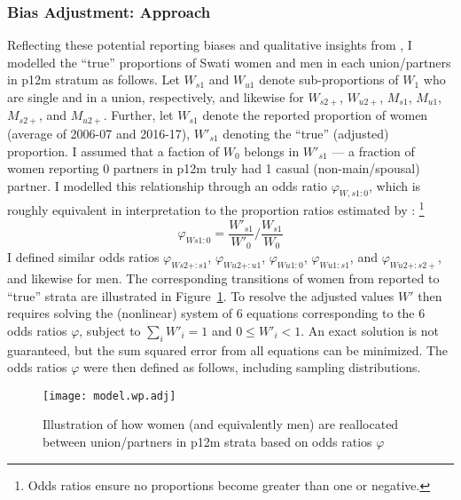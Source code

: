 \subsubsection{Bias Adjustment: Approach}\label{model.par.nsw.bias}
Reflecting these potential reporting biases
and qualitative insights from \cite{Ruark2014,Fielding-Miller2016,Ruark2019,Pulerwitz2021},
I modelled the ``true'' proportions of Swati women and men
in each union/partners in p12m stratum as follows.
Let $W_{s1}$ and $W_{u1}$ denote sub-proportions of $W_{1}$ who are single and in a union, respectively,
and likewise for $W_{s2+}$, $W_{u2+}$, $M_{s1}$, $M_{u1}$, $M_{s2+}$, and $M_{u2+}$.
Further, let $W_{s1}$ denote the reported proportion of women (average of 2006-07 and 2016-17),
\vs $W'_{s1}$ denoting the ``true'' (adjusted) proportion.
I assumed that a faction of $W_{0}$ belongs in $W'_{s1}$
--- \ie a fraction of women reporting 0 partners in p12m truly had 1 casual (non-main/spousal) partner.
I modelled this relationship through an odds ratio $\varphi_{W,s1:0}$,
which is roughly equivalent in interpretation to
the proportion ratios estimated by \citet{Behanzin2013}:%
\footnote{Odds ratios ensure no proportions become greater than one or negative.}
\begin{equation}\label{eq:Cwp.or}
  \varphi_{Ws1:0} = \frac{W'_{s1}}{W'_{0}} \bigg/ \frac{W_{s1}}{W_{0}}
\end{equation}
I defined similar odds ratios $\varphi_{Ws2+:s1}$, $\varphi_{Wu2+:u1}$,
$\varphi_{Wu1:0}$, $\varphi_{Wu1:s1}$, and $\varphi_{Wu2+:s2+}$, and likewise for men.
The corresponding transitions of women from reported to ``true'' strata
are illustrated in Figure~\ref{fig:model.nsw.adj}.
To resolve the adjusted values $W'$ then requires
solving the (nonlinear) system of 6 equations corresponding to the 6 odds ratios $\varphi$,
subject to $\sum_i W'_i = 1$ and $0 \le W'_i < 1$.
An exact solution is not guaranteed,
but the sum squared error from all equations can be minimized.
The odds ratios $\varphi$ were then defined as follows, including sampling distributions.
\begin{figure}
  \centering
  \texttt{[image: model.wp.adj]}
  \caption{Illustration of how women (and equivalently men)
    are reallocated between union/partners in p12m strata
    based on odds ratios $\varphi$}
  \label{fig:model.nsw.adj}
\end{figure}
